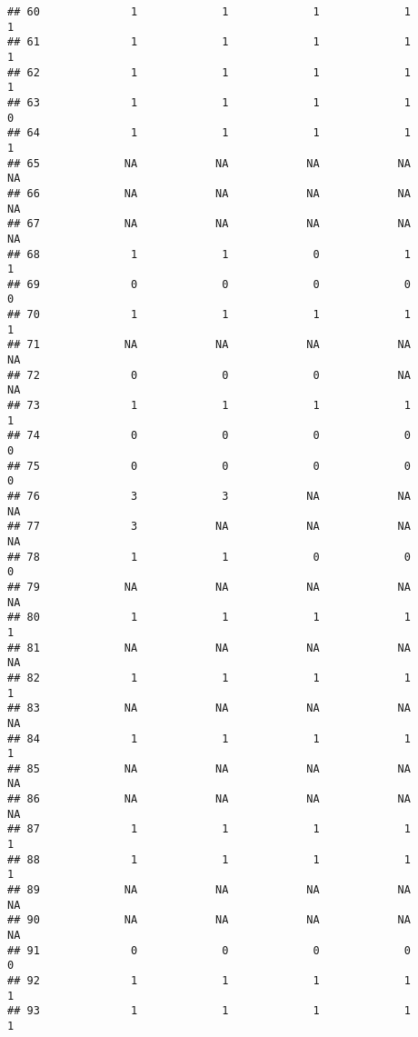 \documentclass[
]{article}
\begin{document}
\begin{verbatim}
## 60              1             1             1             1             1
## 61              1             1             1             1             1
## 62              1             1             1             1             1
## 63              1             1             1             1             0
## 64              1             1             1             1             1
## 65             NA            NA            NA            NA            NA
## 66             NA            NA            NA            NA            NA
## 67             NA            NA            NA            NA            NA
## 68              1             1             0             1             1
## 69              0             0             0             0             0
## 70              1             1             1             1             1
## 71             NA            NA            NA            NA            NA
## 72              0             0             0            NA            NA
## 73              1             1             1             1             1
## 74              0             0             0             0             0
## 75              0             0             0             0             0
## 76              3             3            NA            NA            NA
## 77              3            NA            NA            NA            NA
## 78              1             1             0             0             0
## 79             NA            NA            NA            NA            NA
## 80              1             1             1             1             1
## 81             NA            NA            NA            NA            NA
## 82              1             1             1             1             1
## 83             NA            NA            NA            NA            NA
## 84              1             1             1             1             1
## 85             NA            NA            NA            NA            NA
## 86             NA            NA            NA            NA            NA
## 87              1             1             1             1             1
## 88              1             1             1             1             1
## 89             NA            NA            NA            NA            NA
## 90             NA            NA            NA            NA            NA
## 91              0             0             0             0             0
## 92              1             1             1             1             1
## 93              1             1             1             1             1

\end{verbatim}
\end{document}
